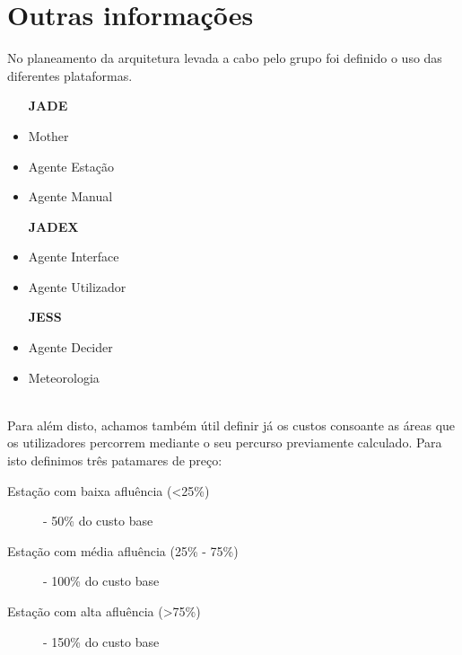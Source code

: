 \section{Outras informações}\label{sec:outros}


No planeamento da arquitetura levada a cabo pelo grupo foi definido o uso das diferentes plataformas.
\\
\begin{itemize}
\item [\textbf{JADE}]
    \item Mother
    \item Agente Estação
    \item Agente Manual
\\
\item [\textbf{JADEX}]
    \item Agente Interface
    \item Agente Utilizador
\\
\item [\textbf{JESS}]
    \item Agente Decider
    \item Meteorologia
\end{itemize}
\\
Para além disto, achamos também útil definir já os custos consoante as áreas que os utilizadores percorrem mediante o seu percurso previamente calculado.
Para isto definimos três patamares de preço:

\begin{description}
    \item [Estação com baixa afluência (<25\%)] - 50\% do custo base
    \item [Estação com média afluência (25\% - 75\%)] - 100\% do custo base
    \item [Estação com alta afluência (>75\%)] - 150\% do custo base
\end{description}